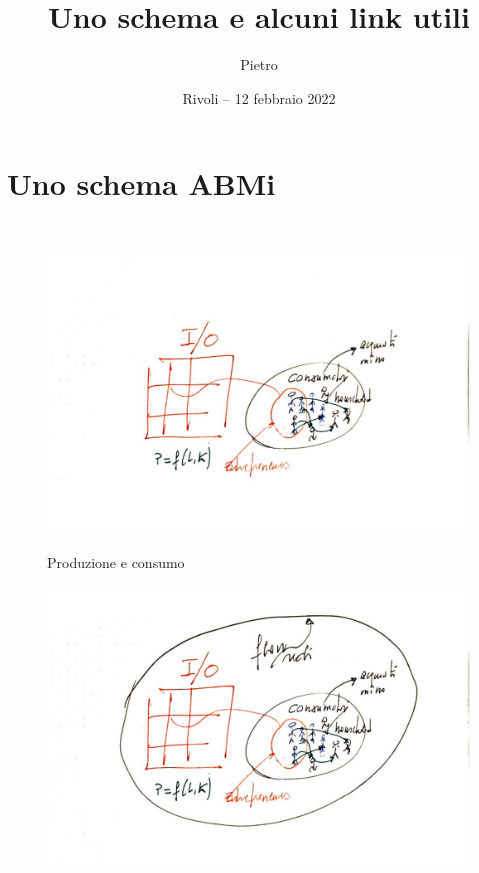 \documentclass[]{beamer}
\title{Uno schema e alcuni link utili}
\author[] %
{Pietro}
\date[] %
{Rivoli -- 12 febbraio 2022}
\begin{document}
\begin{frame}


\titlepage


\end{frame}

\section{Uno schema ABMi}

\begin{frame}{~} %



\begin{figure}[H]
\center
\includegraphics[scale=0.50]{1.pdf}
\label{1}
\caption{Produzione e consumo}
\end{figure}

\end{frame}

\begin{frame}{2}



\begin{figure}[H]
\center
\includegraphics[scale=0.55]{2.pdf}
\end{figure}

\end{frame}
\end{document}
